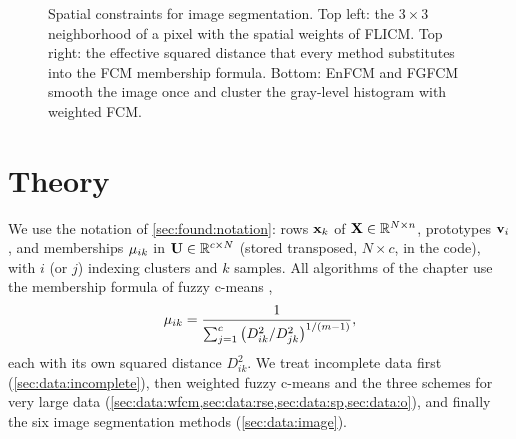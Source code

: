 \begin{figure}[htbp]
\caption[Spatial constraints for image segmentation.]{Spatial constraints for image segmentation. Top left: the $3\times3$ neighborhood of a pixel with the spatial weights of FLICM. Top right: the effective squared distance that every method substitutes into the FCM membership formula. Bottom: EnFCM and FGFCM smooth the image once and cluster the gray-level histogram with weighted FCM.}
\label{fig:data:pixels}
\end{figure}

\section{Theory}\label{sec:data:theory}

We use the notation of \cref{sec:found:notation}: rows $\mathbf{x}_k$ of $\mathbf{X}\in\mathbb{R}^{N\times n}$, prototypes $\mathbf{v}_i$, and memberships $\mu_{ik}$ in $\mathbf{U}\in\mathbb{R}^{c\times N}$ (stored transposed, $N\times c$, in the code), with $i$ (or $j$) indexing clusters and $k$ samples. All algorithms of the chapter use the membership formula of fuzzy c-means \cite{bezdek:1981},
\begin{equation}
  \mu_{ik}=\frac{1}{\sum_{j=1}^{c}\big(D^2_{ik}/D^2_{jk}\big)^{1/(m-1)}},
  \label{eq:data:mu}
\end{equation}
each with its own squared distance $D^2_{ik}$. We treat incomplete data first (\cref{sec:data:incomplete}), then weighted fuzzy c-means and the three schemes for very large data (\cref{sec:data:wfcm,sec:data:rse,sec:data:sp,sec:data:o}), and finally the six image segmentation methods (\cref{sec:data:image}).

